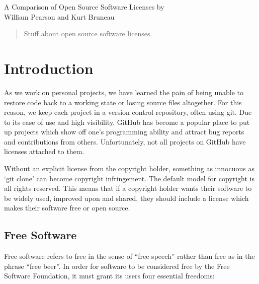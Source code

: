 \documentclass[12pt,letterpaper]{article}
\begin{document}
\thispagestyle{empty}

\begin{titlepage}
\vspace*{1.5in}
\begin{center}
  \huge A Comparison of Open Source Software Licenses
  \vskip1.5in
  \large by \\
  \large William Pearson and Kurt Bruneau \\
\end{center}
\end{titlepage}


\tableofcontents
\listoffigures
\newpage

\begin{abstract}
Stuff about open source software licenses.
\end{abstract}
\newpage
\thispagestyle{empty}
\setcounter{page}{1}

\section{Introduction}

As we work on personal projects, we have learned the pain of being unable to restore code back to a working state or losing source files altogether. For this reason, we keep each project in a version control repository, often using git. Due to its ease of use and high visibility, GitHub has become a popular place to put up projects which show off one's programming ability and attract bug reports and contributions from others. Unfortunately, not all projects on GitHub have licenses attached to them.

Without an explicit license from the copyright holder, something as innocuous as `git clone' can become copyright infringement. The default model for copyright is all rights reserved. This means that if a copyright holder wants their software to be widely used, improved upon and shared, they should include a license which makes their software free or open source.

\subsection{Free Software}

Free software refers to free in the sense of ``free speech'' rather than free as in the phrase ``free beer''. In order for software to be considered free by the Free Software Foundation, it must grant its users four essential freedoms:
\end{document}
